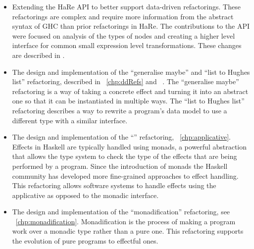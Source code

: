 \begin{itemize}
	\item Extending the HaRe API to better support data-driven refactorings. These refactorings are complex and require more information from the abstract syntax of GHC than prior refactorings in HaRe. The contributions to the API were focused on analysis of the types of nodes and creating a higher level interface for common small expression level transformations. These changes are described in \DIFdelbegin \textbf{}%
\DIFdelend \DIFaddbegin {}\DIFaddend .
	\item The design and implementation of the ``generalise maybe'' and ``list to Hughes list'' refactoring, described in \DIFdelbegin {}\DIFdelend \DIFaddbegin {}\DIFaddend ~\ref{chp:ddRefs} and ~\DIFdelbegin \DIFdel{\ref{generalImp}}\DIFdelend \DIFaddbegin \DIFadd{\ref{chp:generalImp}}\DIFaddend . The ``generalise maybe'' refactoring is a way of taking a concrete effect and turning it into an abstract one so that it can be instantiated in multiple ways. The ``list to Hughes list'' refactoring describes a way to rewrite  a program's data model to use a different type with a similar interface.
	\item The design and implementation of the ``\DIFdelbegin {}\DIFdelend \DIFaddbegin {}\DIFaddend '' refactoring, \DIFdelbegin {}\DIFdelend \DIFaddbegin {}\DIFaddend ~\ref{chp:applicative}. Effects in Haskell are typically handled using monads, a powerful abstraction that allows the type system to check the type of the effects that are being performed by a program. Since the introduction of monads the Haskell community has developed more fine-grained approaches to effect handling. This refactoring allows software systems to handle effects using the applicative as opposed to the monadic interface.
	\item The design and implementation of the ``monadification'' refactoring, see \DIFdelbegin {}\DIFdelend \DIFaddbegin {}\DIFaddend ~\ref{chp:monadification}. Monadification is the process of making a program work over a monadic type rather than a pure one. This refactoring supports the evolution of pure programs to effectful ones.
\end{itemize}


\DIFaddbegin \chapter{}
\label{chp:related}

